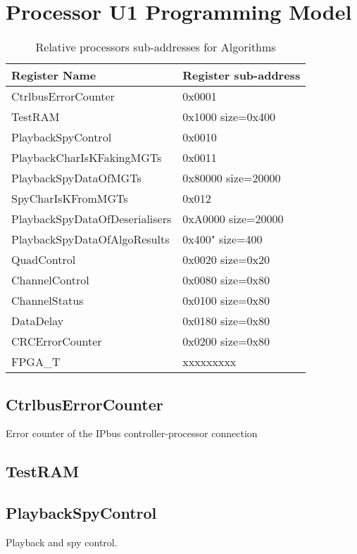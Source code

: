 
\section{Processor U1 Programming Model}
\label{section_2}

\begin {table}[H]
\caption {Relative processors sub-addresses for Algorithms}
\label{tab_low_reg_control}
\begin{tabular}{|l|l|}
\hline
Register Name & Register sub-address \\
\hline
CtrlbusErrorCounter & 0x0001 \\
TestRAM & 0x1000 size=0x400 \\ 
PlaybackSpyControl  & 0x0010 \\ 
PlaybackCharIsKFakingMGTs & 0x0011 \\ 
PlaybackSpyDataOfMGTs & 0x80000 size=20000 \\ 
SpyCharIsKFromMGTs & 0x012 \\ 
PlaybackSpyDataOfDeserialisers & 0xA0000 size=20000 \\ 
PlaybackSpyDataOfAlgoResults & 0x400" size=400 \\
QuadControl & 0x0020 size=0x20 \\ 
ChannelControl & 0x0080 size=0x80 \\ 
ChannelStatus & 0x0100 size=0x80 \\ 
DataDelay & 0x0180 size=0x80 \\ 
CRCErrorCounter & 0x0200 size=0x80 \\ 
FPGA\_T   &  xxxxxxxxx \\
\hline
\end{tabular}
\end{table}

\subsection{CtrlbusErrorCounter}
Error counter of the IPbus controller-processor connection

\subsection{TestRAM}

\subsection{PlaybackSpyControl}
Playback and spy control.
%

